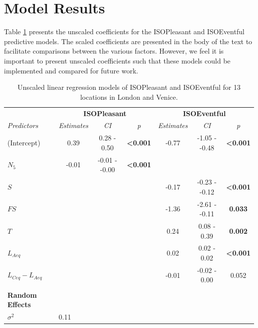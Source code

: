 \section{Model Results}
\label{app:mod}
Table \ref{tab:unscl} presents the unscaled coefficients for the ISOPleasant and ISOEventful predictive models. The scaled coefficients are presented in the body of the text to facilitate comparisons between the various factors. However, we feel it is important to present unscaled coefficients such that these models could be implemented and compared for future work. 


\begin{table}[!ht]
\centering
\caption{Unscaled linear regression models of ISOPleasant and ISOEventful for 13 locations in London and Venice.}
\label{tab:unscl}
\def\arraystretch{.5}
\begin{tabular}{@{}l|lccccc@{}}
\toprule
\multicolumn{1}{l|}{} &
  \multicolumn{3}{c}{\textbf{ISOPleasant}} &
  \multicolumn{3}{c}{\textbf{ISOEventful}} \\
\textit{Predictors} &
  \multicolumn{1}{c}{\textit{Estimates}} &
  \textit{CI} &
  \textit{p} &
  \textit{Estimates} &
  \textit{CI} &
  \textit{p} \\ \midrule
(Intercept) &
  \multicolumn{1}{c}{0.39} &
  0.28 - 0.50 &
  \textbf{\textless{}0.001} &
  -0.77 &
  -1.05 - -0.48 &
  \textbf{\textless{}0.001} \\
$N_5$ &
  \multicolumn{1}{c}{-0.01} &
  -0.01 - -0.00 &
  \textbf{\textless{}0.001} &
  &
  &
  \\
$S$ &
  \multicolumn{1}{c}{} &
  &
  &
  -0.17 &
  -0.23 - -0.12 &
  \textbf{\textless{}0.001} \\
$FS$ &
  \multicolumn{1}{c}{} &
  &
  &
  -1.36 &
  -2.61 - -0.11 &
  \textbf{0.033} \\
$T$ &
  \multicolumn{1}{c}{} &
  &
  &
  0.24 &
  0.08 - 0.39 &
  \textbf{0.002} \\
$L_{Aeq}$ &
  \multicolumn{1}{c}{} &
  &
  &
  0.02 &
  0.02 - 0.02 &
  \textbf{\textless{}0.001} \\
$L_{Ceq}-L_{Aeq}$ &
  \multicolumn{1}{c}{} &
  &
  &
  -0.01 &
  -0.02 - 0.00 &
  0.052 \\
  \\
\textbf{Random Effects} &     & \multicolumn{1}{l}{} & \multicolumn{1}{l}{} & \multicolumn{1}{l}{}    & \multicolumn{1}{l}{} & \multicolumn{1}{l}{} \\
$\sigma^2$ &
  0.11 &
  \multicolumn{1}{l}{} &
  \multicolumn{1}{l}{} &
  \multicolumn{1}{l}{} &
  \multicolumn{1}{l}{} &

\end{tabular}
\end{table}
